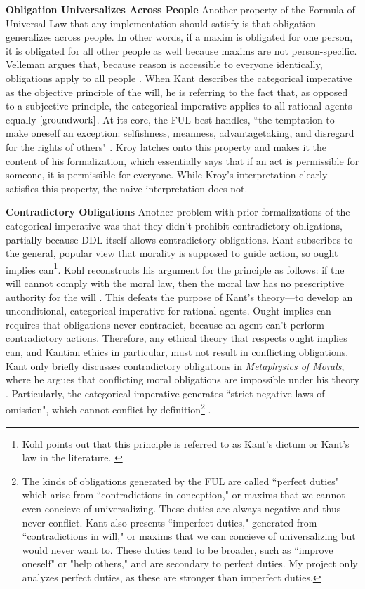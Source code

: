 \begin{isabellebody}
\begin{isamarkuptext}
\medskip 

\textbf{Obligation Universalizes Across People} Another property of the Formula of Universal Law that any implementation should satisfy is that obligation
generalizes across people. In other words, if a maxim is obligated for one person, it is obligated
for all other people as well because maxims are not person-specific. Velleman argues that, because 
reason is accessible to everyone identically, obligations apply to all people \cite[25]{velleman}. 
When Kant describes the categorical imperative as the objective principle of the will, he is referring 
to the fact that, as opposed to a subjective principle, the categorical imperative applies to all 
rational agents equally $\cite[16]{groundwork}$. At its core, the FUL best handles, ``the temptation 
to make oneself an exception: selfishness, meanness, advantagetaking, and disregard for the rights 
of others" \cite[30]{korsgaardFUL}. Kroy latches onto this property and makes it the content of his
formalization, which essentially says that if an act is permissible for someone, it is permissible for 
everyone. While Kroy's interpretation clearly satisfies this property, the naive interpretation does not.

\textbf{Contradictory Obligations} Another problem with prior formalizations of the categorical imperative was that they didn't
prohibit contradictory obligations, partially because DDL itself allows contradictory obligations. 
Kant subscribes to the general, popular view that morality is supposed to guide action, so ought implies 
can\footnote{Kohl points out that this principle is referred to as 
Kant's dictum or Kant's law in the literature. \cite[footnote 1]{kohl}}. Kohl reconstructs his argument for the principle as 
follows: if the will cannot comply with the moral law, then the moral law has no prescriptive authority 
for the will \cite[703-4]{kohl}. This defeats the purpose of Kant's theory—to develop an unconditional, categorical imperative 
for rational agents. Ought implies can requires that obligations never contradict, because an agent 
can't perform contradictory actions. Therefore, any ethical theory that respects ought implies can, 
and Kantian ethics in particular, must not result in conflicting obligations. 
Kant only briefly discusses contradictory obligations in \emph{Metaphysics of Morals}, where he argues that 
conflicting moral obligations are impossible under his theory \cite[V224]{metaphysicsintro}. Particularly, the categorical imperative generates 
``strict negative laws of omission", which cannot conflict by definition\footnote{The 
kinds of obligations generated by the FUL are called ``perfect duties" which arise from ``contradictions 
in conception," or maxims that we cannot even concieve of universalizing. These duties are always negative 
and thus never conflict. Kant also presents ``imperfect duties," generated from ``contradictions in will,"
or maxims that we can concieve of universalizing but would never want to. These duties tend to be broader, 
such as ``improve oneself" or "help others," and are secondary to perfect duties. My project only analyzes 
perfect duties, as these are stronger than imperfect duties.} \cite[45]{timmerman}.


\end{isamarkuptext}
\end{isabellebody}
